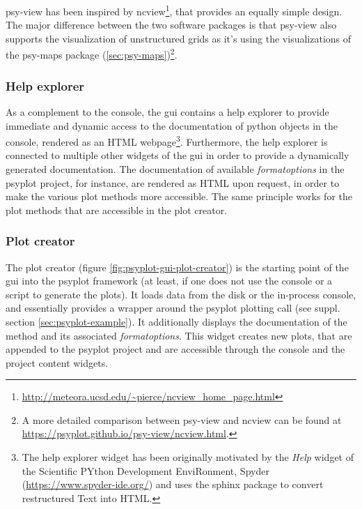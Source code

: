 \documentclass[
11pt, %
english, %
singlespacing, %
headsepline, %
]{article} %
\begin{document}
\begin{refsection}
psy-view has been inspired by ncview\footnote{\url{http://meteora.ucsd.edu/~pierce/ncview_home_page.html}}, that provides an equally simple design. The major difference between the two software packages is that psy-view also supports the visualization of unstructured grids as it's using the visualizations of the psy-maps package (\ref{sec:psy-maps})\footnote{A more detailed comparison between psy-view and ncview can be found at \url{https://psyplot.github.io/psy-view/ncview.html}.}.

\subsubsection{Help explorer}
As a complement to the console, the \gls{gui} contains a help explorer to provide immediate and dynamic access to the documentation of python objects in the console, rendered as an HTML webpage\footnote{The help explorer widget has been originally motivated by the \textit{Help} widget of the Scientific PYthon Development EnviRonment, Spyder (\url{https://www.spyder-ide.org/}) and uses the sphinx package \citep{Hasecke2019} to convert restructured Text into HTML.}. Furthermore, the help explorer is connected to multiple other widgets of the \gls{gui} in order to provide a dynamically generated documentation. The documentation of available \textit{formatoptions} in the psyplot project, for instance, are rendered as HTML upon request, in order to make the various plot methods more accessible. The same principle works for the plot methods that are accessible in the plot creator.

\subsubsection{Plot creator}
The plot creator (figure \ref{fig:psyplot-gui-plot-creator}) is the starting point of the \gls{gui} into the psyplot framework (at least, if one does not use the console or a script to generate the plots). It loads data from the disk or the in-process console, and essentially provides a wrapper around the psyplot plotting call (see suppl. section \ref{sec:psyplot-example}). It additionally displays the documentation of the method and its associated \textit{formatoptions}. This widget creates new plots, that are appended to the psyplot project and are accessible through the console and the project content widgets.


\end{refsection}
\end{document}
